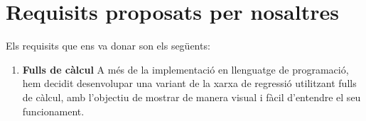\section{Requisits proposats per nosaltres}
\label{sec:Requisits proposats per nosaltres}

Els requisits que ens va donar son els següents:
\begin{enumerate}
 \item \textbf{Fulls de càlcul}
 A més de la implementació en llenguatge de programació, hem decidit desenvolupar una variant de la xarxa de regressió utilitzant fulls de càlcul, amb l’objectiu de mostrar de manera visual i fàcil d'entendre el seu funcionament.
\end{enumerate}







%
